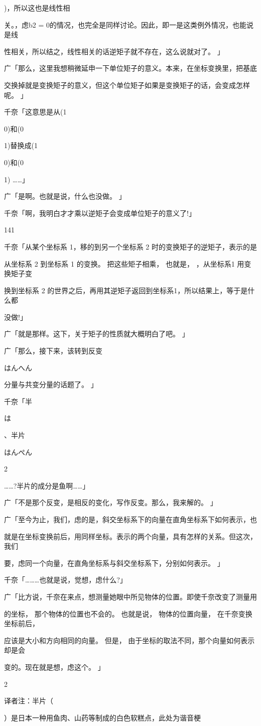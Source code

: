 )，所以这也是线性相\par
关。，虑b2 = 0的情况，也完全是同样讨论。因此，即一是这类例外情况，也能说是线\par
性相关，所以结之，线性相关的话逆矩子就不存在，这么说就对了。 」\par
广「那么，这里我想稍微延申一下单位矩子的意义。本来，在坐标变换里，把基底\par
交换掉就是变换矩子的意义，但这个单位矩子如果是变换矩子的话，会变成怎样呢。 」\par
千奈「这意思是从(1\par
0)和(0\par
1)替换成(1\par
0)和(0\par
1) ……」\par
广「是啊。也就是说，什么也没做。 」\par
千奈「啊，我明白才才乘以逆矩子会变成单位矩子的意义了!」\par

141\par
千奈「从某个坐标系 1，移的到另一个坐标系 2 时的变换矩子的逆矩子，表示的是\par
从坐标系 2 到坐标系 1 的变换。 把这些矩子相乘， 也就是， ，从坐标系1 用变换矩子变\par
换到坐标系 2 的世界之后，再用其逆矩子返回到坐标系1，所以结果上，等于是什么都\par
没做!」\par
广「就是那样。这下，关于矩子的性质就大概明白了吧。 」\par
广「那么，接下来，该转到反变\par
はんへん\par
分量与共变分量的话题了。 」\par
千奈「半\par
は\par
、半片\par
はんぺん\par
2\par
……?半片的成分是鱼啊……」\par
广「不是那个反变，是相反的变化，写作反变。那么，我来解的。 」\par
广「至今为止，我们，虑的是，斜交坐标系下的向量在直角坐标系下如何表示，也\par
就是在坐标变换前后，用同样坐标。表示的两个向量，具有怎样的关系。但这次，我们\par
要，虑同一个向量，在直角坐标系与斜交坐标系下，分别如何表示。 」\par
千奈「………也就是说，觉想，虑什么?」\par
广「比方说，千奈在来点，想测量她眼中所见物体的位置。即使千奈改变了测量用\par
的坐标， 那个物体的位置也不会的。 也就是说， 物体的位置向量， 在千奈变换坐标前后，\par
应该是大小和方向相同的向量。 但是， 由于坐标的取法不同，那个向量如何表示却是会\par
变的。现在就是想，虑这个。 」\par
2\par
译者注：半片（\par
）是日本一种用鱼肉、山药等制成的白色软糕点，此处为谐音梗\par

